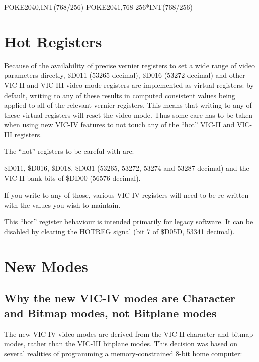 \begin{screenoutput}
POKE2040,INT(768/256)
POKE2041,768-256*INT(768/256)
\end{screenoutput}

\section{Hot Registers}

Because of the availability of precise vernier registers to set a wide
range of video parameters directly, \$D011 (53265 decimal), \$D016 (53272 decimal) and other VIC-II and
VIC-III video mode registers are implemented as virtual registers:
by default, writing to any of these results in computed consistent values being
applied to all of the relevant vernier registers.  This means that
writing to any of these virtual registers will reset the video mode.
Thus some care has to be taken when using new VIC-IV features to not
touch any of the ``hot'' VIC-II and VIC-III registers.

The ``hot'' registers to be careful with are:

\$D011, \$D016, \$D018, \$D031 (53265, 53272, 53274 and 53287 decimal) and the VIC-II bank bits of \$DD00 (56576 decimal).

If you write to any of those, various VIC-IV registers will need to be re-written
with the values you wish to maintain.

This ``hot'' register behaviour is intended primarily for legacy software.
It can be disabled by clearing the HOTREG signal (bit 7 of \$D05D, 53341 decimal).

\section{New Modes}

\subsection{Why the new VIC-IV modes are Character and Bitmap modes, not Bitplane modes}

The new VIC-IV video modes are derived from the VIC-II character and bitmap modes, rather than the VIC-III
bitplane modes. This decision was based on several realities of programming a memory-constrained 8-bit home computer:

